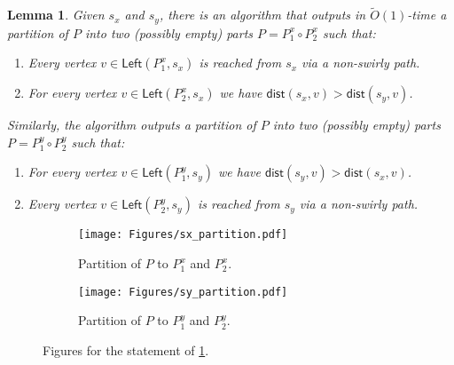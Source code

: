 \documentclass{article}
\newcommand{\Left}{\mathsf{Left}}
\newcommand{\dist}{\mathsf{dist}}
\newtheorem{lemma}{Lemma}
\newcommand{\Otild}{\tilde{O}}
\begin{document}
\begin{lemma}\label{lem:sxsyswirlypartition}
    Given $s_x$ and $s_y$, there is an algorithm that outputs in $\Otild(1)$-time a partition of $P$ into two (possibly empty) parts $P=P^x_1\circ P^x_2$  such that:
    \begin{enumerate}
        \item Every vertex $v\in\Left(P^x_1,s_x)$ is reached from $s_x$ via a non-swirly path.
        \item For every vertex $v\in \Left(P^x_2,s_x)$ we have $\dist(s_x,v)>\dist(s_y,v)$.
    \end{enumerate}
    Similarly, the algorithm outputs a partition of $P$ into two (possibly empty) parts $P=P^y_1\circ P^y_2$  such that:
    \begin{enumerate}
        \item For every vertex $v\in \Left(P^y_1,s_y)$ we have  $\dist(s_y,v)>\dist(s_x,v)$.
        \item Every vertex $v\in \Left(P^y_2,s_y)$ is reached from $s_y$ via a non-swirly path.
    \end{enumerate}
\end{lemma}
\begin{figure}[ht]
    \centering
    \begin{subfigure}[t]{0.3\textwidth}
        \centering
        \texttt{[image: Figures/sx\_partition.pdf]}
        \caption{Partition of $P$ to $P^x_1$ and $P^x_2$.}
    \end{subfigure}
    \hspace{1in}
    \begin{subfigure}[t]{0.3\textwidth}
        \centering
        \texttt{[image: Figures/sy\_partition.pdf]}
        \caption{Partition of $P$ to $P^y_1$ and $P^y_2$.}
        \label{fig:Py12}
    \end{subfigure}
    \caption{Figures for the statement of  \cref{lem:sxsyswirlypartition}.}
    \label{fig:Px12Py12}
\end{figure}
\end{document}
